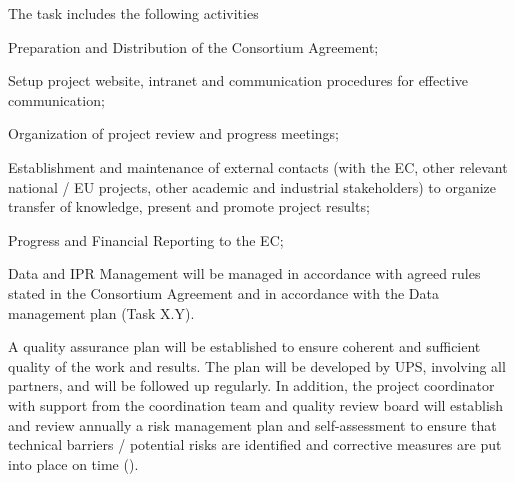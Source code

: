 \begin{workpackage}
\begin{tasklist}
\begin{task}[title=Project and financial management,
id=project-finance-management,lead=PS,PM=33,
partners={LL,UV,UJF,UB,UO,USH,USO,SA,UW,JU,UK,US,ZH,SR,UWS}]
The task includes the following activities
  \begin{compactitem}
  \item Preparation and Distribution of the
    Consortium Agreement;
  \item Setup project website, intranet and
    communication procedures for effective communication;
  \item
    Organization of project review and progress meetings;
  \item
    Establishment and maintenance of external contacts (with the EC,
    other relevant national / EU projects, other academic and
    industrial stakeholders) to organize transfer of knowledge,
    present and
promote project results;
  \item Progress and Financial Reporting to the EC;
  \item Data and IPR Management will be managed in accordance with agreed rules stated in the
Consortium Agreement and in accordance with the Data management plan (Task X.Y).
  \end{compactitem}
\end{task}

\begin{task}[title=Quality assurance and risk management,id=project-quality-management,lead=PS,PM=15,partners={LL,UV,UJF,UB,UO,USH,USO,SA,UW,JU,UK,US,ZH,SR,UWS}]
A quality assurance plan will be established to ensure coherent and sufficient quality of the work
and results. The plan will be developed by UPS, involving all partners, and will be followed up
regularly. In addition, the project coordinator with support from the coordination team and quality review board will establish and review annually a risk management plan and self-assessment to ensure that technical barriers / potential risks are identified  and corrective measures are put into place on time ().
\end{task}


\end{tasklist}
\end{workpackage}
